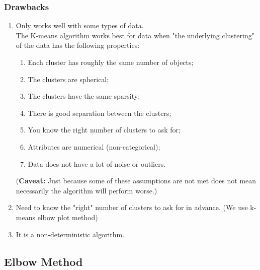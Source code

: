 \documentclass[11pt]{elegantbook}
\begin{document}
\subsubsection*{Drawbacks}
\begin{enumerate}[$\bullet$]
    \item Only works well with some types of data.\\
    The K-means algorithm works best for data when "the underlying clustering" of the data has the following properties:
    \begin{enumerate}[(1).]
        \item Each cluster has roughly the same number of objects;
        \item The clusters are spherical;
        \item The clusters have the same sparsity;
        \item There is good separation between the clusters;
        \item You know the right number of clusters to ask for;
        \item Attributes are numerical (non-categorical);
        \item Data does not have a lot of noise or outliers.
    \end{enumerate}
    (\textbf{Caveat:} Just because some of these assumptions are not met does not mean necessarily the algorithm will perform worse.)
    \item Need to know the "right" number of clusters to ask for in advance.
    (We use k-means elbow plot method)
    \item It is a non-deterministic algorithm.
\end{enumerate}

\subsection{Elbow Method}
\end{document}
